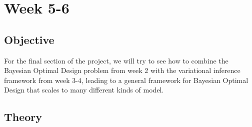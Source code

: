 \section{Week 5-6}
\subsection{Objective}
For the final section of the project, we will try to see how to combine the Bayesian Optimal Design problem from week 2 with the variational inference framework from week 3-4, 
leading to a general framework for Bayesian Optimal Design that scales to many different kinds of model.
\subsection{Theory}

